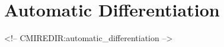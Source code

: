 
\chapter{Automatic Differentiation}
\begin{rawhtml}
<!-- CMIREDIR:automatic_differentiation -->
\end{rawhtml}





\newpage



\newpage


\newpage

